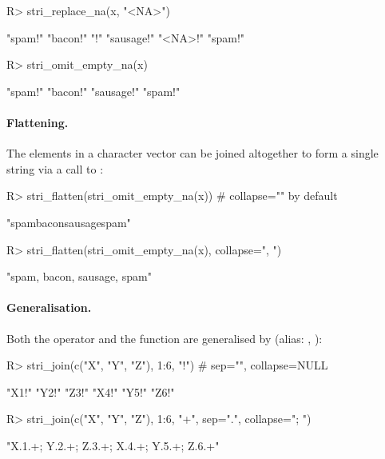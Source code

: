 \documentclass[nojss]{jss}
\begin{document}
\begin{Schunk}
\begin{Sinput}
R> stri_replace_na(x, "<NA>") %s+% "!"
\end{Sinput}
\begin{Soutput}
[1] "spam!"    "bacon!"   "!"        "sausage!" "<NA>!"    "spam!"
\end{Soutput}
\begin{Sinput}
R> stri_omit_empty_na(x) %s+% "!"
\end{Sinput}
\begin{Soutput}
[1] "spam!"    "bacon!"   "sausage!" "spam!"
\end{Soutput}
\end{Schunk}


\paragraph{Flattening.}
The elements in a character vector can be joined altogether to
form a single string via a call to  :

\begin{Schunk}
\begin{Sinput}
R> stri_flatten(stri_omit_empty_na(x))  # collapse="" by default
\end{Sinput}
\begin{Soutput}
[1] "spambaconsausagespam"
\end{Soutput}
\begin{Sinput}
R> stri_flatten(stri_omit_empty_na(x), collapse=", ")
\end{Sinput}
\begin{Soutput}
[1] "spam, bacon, sausage, spam"
\end{Soutput}
\end{Schunk}


\paragraph{Generalisation.}
Both the  operator and the  function
are generalised by
 (alias: , ):

\begin{Schunk}
\begin{Sinput}
R> stri_join(c("X", "Y", "Z"), 1:6, "!")  # sep="", collapse=NULL
\end{Sinput}
\begin{Soutput}
[1] "X1!" "Y2!" "Z3!" "X4!" "Y5!" "Z6!"
\end{Soutput}
\begin{Sinput}
R> stri_join(c("X", "Y", "Z"), 1:6, "+", sep=".", collapse="; ")
\end{Sinput}
\begin{Soutput}
[1] "X.1.+; Y.2.+; Z.3.+; X.4.+; Y.5.+; Z.6.+"
\end{Soutput}
\end{Schunk}
\end{document}
